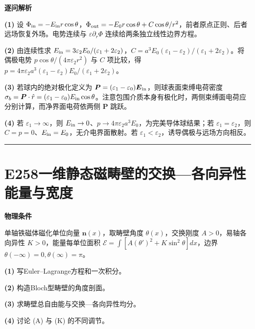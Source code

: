 \documentclass[UTF8,a4paper,11pt,oneside,openany]{ctexbook}
\begin{document}
\par\medskip\noindent\textbf{逐问解析}
\par\noindent\textbf{(1)} 设 \(\Phi_{\rm in}=-E_{\rm in}r\cos\theta\)，\(\Phi_{\rm out}=-E_0r\cos\theta+C\cos\theta/r^2\)，前者原点正则、后者远场恢复外场。电势连续与 \(\varepsilon\partial_r\Phi\) 连续给两条独立线性边界方程。
\par\noindent\textbf{(2)} 由连续性求 \(E_{\rm in}=3\varepsilon_2E_0/(\varepsilon_1+2\varepsilon_2)\)，\(C=a^3E_0(\varepsilon_1-\varepsilon_2)/(\varepsilon_1+2\varepsilon_2)\)。将偶极电势 \(p\cos\theta/(4\pi\varepsilon_2r^2)\) 与 \(C\) 项比较，得 \(p=4\pi\varepsilon_2a^3(\varepsilon_1-\varepsilon_2)E_0/(\varepsilon_1+2\varepsilon_2)\)。
\par\noindent\textbf{(3)} 若球内的绝对极化定义为 \(\boldsymbol P=(\varepsilon_1-\varepsilon_0)\boldsymbol E_{\rm in}\)，则球表面束缚电荷密度 \(\sigma_b=\boldsymbol P\cdot\hat r=(\varepsilon_1-\varepsilon_0)E_{\rm in}\cos\theta\)。注意包围介质本身有极化时，两侧束缚面电荷应分别计算，而净界面电荷依两侧 \(\boldsymbol P\) 跳跃。
\par\noindent\textbf{(4)} 若 \(\varepsilon_1\to\infty\)，则 \(E_{\rm in}\to0\)、\(p\to4\pi\varepsilon_2a^3E_0\)，为完美导体球结果；若 \(\varepsilon_1=\varepsilon_2\)，则 \(C=p=0\)、\(E_{\rm in}=E_0\)，无介电界面散射。若 \(\varepsilon_1<\varepsilon_2\)，诱导偶极与远场方向相反。

\par\bigskip\hrule\bigskip
\section*{E258\quad 一维静态磁畴壁的交换—各向异性能量与宽度}
\textbf{物理条件}\par 单轴铁磁体磁化单位向量 \(\boldsymbol n(x)\)，取畴壁角度 \(\theta(x)\)，交换刚度 \(A>0\)，易轴各向异性 \(K>0\)，能量每单位面积 \(\mathcal E=\int[A(\theta')^2+K\sin^2\theta]dx\)，边界 \(\theta(-\infty)=0,\theta(\infty)=\pi\)。
\par\noindent\textbf{(1)} 写Euler–Lagrange方程和一次积分。
\par\noindent\textbf{(2)} 构造Bloch型畴壁的角度剖面。
\par\noindent\textbf{(3)} 求畴壁总自由能与交换—各向异性均分。
\par\noindent\textbf{(4)} 讨论 (A) 与 (K) 的不同调节。
\end{document}
